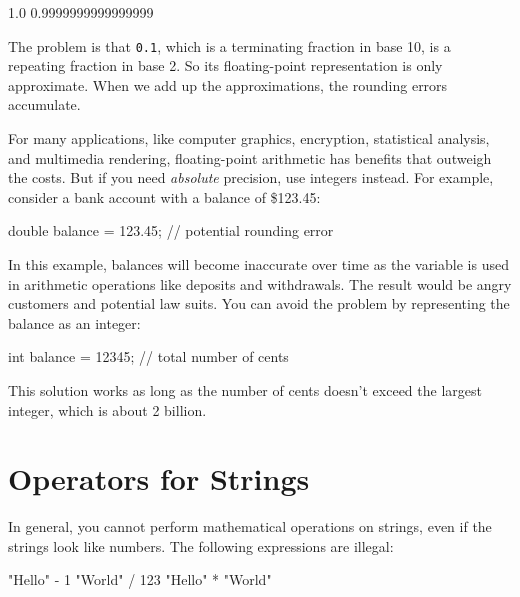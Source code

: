 \documentclass[12pt]{book}
\theoremstyle{exercise}
\newcommand{\java}[1]{\verb"#1"}
\begin{document}
\begin{stdout}
1.0
0.9999999999999999
\end{stdout}

The problem is that \java{0.1}, which is a terminating fraction in base 10, is a repeating fraction in base 2.
So its floating-point representation is only approximate.
When we add up the approximations, the rounding errors accumulate.

For many applications, like computer graphics, encryption, statistical analysis, and multimedia rendering, floating-point arithmetic has benefits that outweigh the costs.
But if you need {\em absolute} precision, use integers instead.
For example, consider a bank account with a balance of \$123.45:

\begin{code}
    double balance = 123.45;  // potential rounding error
\end{code}

In this example, balances will become inaccurate over time as the variable is used in arithmetic operations like deposits and withdrawals.
The result would be angry customers and potential law suits.
You can avoid the problem by representing the balance as an integer:

\begin{code}
    int balance = 12345;      // total number of cents
\end{code}


This solution works as long as the number of cents doesn't exceed the largest integer, which is about 2 billion.


\section{Operators for Strings}


In general, you cannot perform mathematical operations on strings, even if the strings look like numbers.
The following expressions are illegal:

\begin{code}
    "Hello" - 1     "World" / 123     "Hello" * "World"
\end{code}

\end{document}
